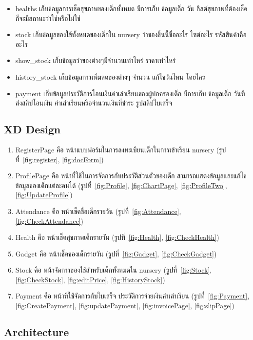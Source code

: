 \begin{itemize}
    \item healths เก็บข้อมูลการเช็คสุขภาพของเด็กทั้งหมด มีการเก็บ ข้อมูลเด็ก วัน ลิสต์สุขภาพที่ต้องเช็ค ก็จะมีสถานะว่าใช่หรือไม่ใช่
    \item stock เก็บข้อมูลของใช้ทั้งหมดของเด็กใน nursery ว่าของชิ้นนี้ชื่ออะไร ไซต์อะไร รหัสสินค้าคืออะไร
    \item show\_stock เก็บข้อมูลว่าของต่างๆมีจำนวนเท่าไหร่ ราคาเท่าไหร่
    \item history\_stock เก็บข้อมูลการเพิ่มลดของต่างๆ จำนวน แก้ไขวันไหน โดยใคร
    \item payment เก็บข้อมูลประวัติการโอนเงินค่าเล่าเรียนของผู้ปกครองเด็ก มีการเก็บ ข้อมูลเด็ก วันที่ส่งสลิปโอนเงิน ค่าเล่าเรียนหรือจำนวนเงินที่ชำระ รูปสลิปใบเสร็จ 
  \end{itemize}

\subsection{XD Design}

\begin{enumerate}
  \item RegisterPage คือ หน้าแบบฟอร์มในการลงทะเบียนเด็กในการเข้าเรียน nursery (รูปที่~\ref{fig:register}, \ref{fig:docForm})
  \item  ProfilePage คือ หน้าที่ใช้ในการจัดการกับประวัติส่วนตัวของเด็ก สามารถแสดงข้อมูลและแก้ไขข้อมูลของเด็กแต่ละคนได้ (รูปที่~\ref{fig:Profile}, \ref{fig:ChartPage}, \ref{fig:ProfileTwo}, \ref{fig:UpdateProfile})
  \item  Attendance คือ หน้าเช็คชื่อเด็กรายวัน (รูปที่~\ref{fig:Attendance}, \ref{fig:CheckAttendance})
  \item  Health คือ หน้าเช็คสุขภาพเด็กรายวัน (รูปที่~\ref{fig:Health}, \ref{fig:CheckHealth}) 
  \item  Gadget คือ หน้าเช็คของเด็กรายวัน (รูปที่~\ref{fig:Gadget}, \ref{fig:CheckGadget}) 
  \item  Stock คือ หน้าจัดการของใช้สำหรับเด็กทั้งหมดใน nursery (รูปที่~\ref{fig:Stock}, \ref{fig:CheckStock}, \ref{fig:editPrice}, \ref{fig:HistoryStock}) 
  \item  Payment คือ หน้าที่ใช้จัดการกับใบเสร็จ ประวัติการจ่ายเงินค่าเล่าเรียน (รูปที่~\ref{fig:Payment}, \ref{fig:CreatePayment}, \ref{fig:updatePayment}, \ref{fig:invoicePage}, \ref{fig:slipPage}) 
\end{enumerate}

\subsection{Architecture}

